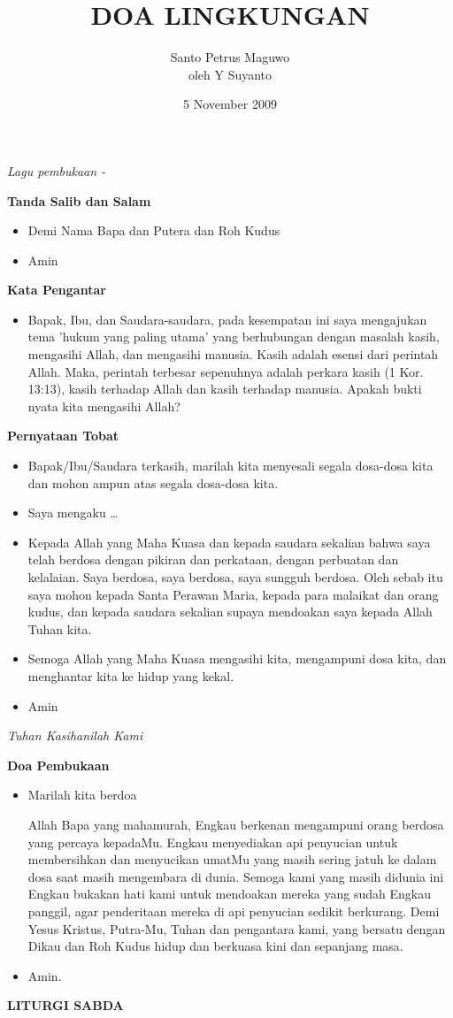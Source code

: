 \documentclass[a5paper,headsepline,titlepage,10pt,nnormalheadings,DIVcalc]{scrbook}
\title{DOA LINGKUNGAN}
\author{
Santo Petrus Maguwo \\
oleh Y Suyanto}
\date{5 November 2009}
\makeatletter
\newcommand{\judul}[1]{%
  {\parindent \z@ \centering 
    \interlinepenalty\@M \Large \bfseries #1\par\nobreak \vskip 20\p@ }}
\newcommand{\subjudul}[1]{%
  {\parindent \z@ 
    \interlinepenalty\@M \bfseries #1\par\nobreak \vskip 10\p@ }}
\newcommand{\lagu}[1]{%
  {\parindent \z@ 
    \interlinepenalty\@M \slshape \mdseries \Large \textsl{#1}\par\nobreak \vskip 20\p@ }}
\newcommand{\BU}[1]{\begin{itemize} \item[U:] #1 \end{itemize}}
\newcommand{\BP}[1]{\begin{itemize} \item[P:] #1 \end{itemize}}
\newcommand{\lagupembukaan}{~}
\makeatother
\begin{document}
\sffamily
\maketitle
\thispagestyle{empty}

\lagu{Lagu pembukaan - \lagupembukaan}

\subjudul{Tanda Salib dan Salam}
\BP{Demi Nama Bapa dan Putera dan Roh Kudus}
\BU{Amin}

\subjudul{Kata Pengantar}
\BP{Bapak, Ibu, dan Saudara-saudara, pada kesempatan ini saya mengajukan tema 'hukum yang paling utama' yang berhubungan dengan masalah kasih, mengasihi Allah, dan mengasihi manusia. Kasih adalah esensi dari perintah Allah. Maka, perintah terbesar sepenuhnya adalah perkara kasih (1 Kor. 13:13), kasih terhadap Allah dan kasih terhadap manusia. Apakah bukti nyata kita mengasihi Allah?}

\subjudul{Pernyataan Tobat}
\BU{Bapak/Ibu/Saudara terkasih, marilah kita menyesali segala dosa-dosa kita dan
mohon ampun atas segala dosa-dosa kita.}
\BP{Saya mengaku \dots}
\BU{Kepada Allah yang Maha Kuasa dan kepada saudara sekalian bahwa saya telah
berdosa dengan pikiran dan perkataan, dengan perbuatan dan kelalaian. Saya
berdosa, saya berdosa, saya sungguh berdosa. Oleh sebab itu saya mohon kepada
Santa Perawan Maria, kepada para malaikat dan orang kudus, dan kepada saudara
sekalian supaya mendoakan saya kepada Allah Tuhan kita.}
\BP{Semoga Allah yang Maha Kuasa mengasihi kita, mengampuni dosa kita, dan
menghantar kita ke hidup yang kekal.}
\BU{Amin}

\lagu{Tuhan Kasihanilah Kami}

\subjudul{Doa Pembukaan}
\BP{Marilah kita berdoa

Allah Bapa yang mahamurah, Engkau berkenan mengampuni orang berdosa yang percaya kepadaMu. Engkau menyediakan api penyucian untuk membersihkan dan menyucikan umatMu yang masih sering jatuh ke dalam dosa saat masih mengembara di dunia. Semoga kami yang masih didunia ini Engkau bukakan hati kami untuk mendoakan mereka yang sudah Engkau panggil, agar penderitaan mereka di api penyucian sedikit berkurang. 
Demi Yesus Kristus, Putra-Mu, Tuhan dan pengantara kami, yang bersatu dengan Dikau dan Roh Kudus hidup dan berkuasa kini dan sepanjang masa.}

\BU{Amin.}

\judul{LITURGI SABDA}
\end{document}
